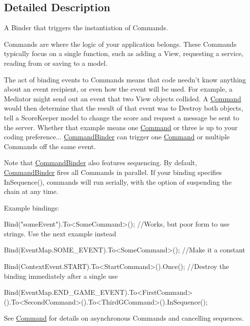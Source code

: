 \subsection{Detailed Description}
A Binder that triggers the instantiation of Commands. 

Commands are where the logic of your application belongs. These Commands typically focus on a single function, such as adding a View, requesting a service, reading from or saving to a model.

The act of binding events to Commands means that code needn't know anything about an event recipient, or even how the event will be used. For example, a Mediator might send out an event that two View objects collided. A \hyperlink{classstrange_1_1extensions_1_1command_1_1impl_1_1_command}{Command} would then determine that the result of that event was to Destroy both objects, tell a Score\-Keeper model to change the score and request a message be sent to the server. Whether that example means one \hyperlink{classstrange_1_1extensions_1_1command_1_1impl_1_1_command}{Command} or three is up to your coding preference... \hyperlink{classstrange_1_1extensions_1_1command_1_1impl_1_1_command_binder}{Command\-Binder} can trigger one \hyperlink{classstrange_1_1extensions_1_1command_1_1impl_1_1_command}{Command} or multiple Commands off the same event.

Note that \hyperlink{classstrange_1_1extensions_1_1command_1_1impl_1_1_command_binder}{Command\-Binder} also features sequencing. By default, \hyperlink{classstrange_1_1extensions_1_1command_1_1impl_1_1_command_binder}{Command\-Binder} fires all Commands in parallel. If your binding specifies {\ttfamily In\-Sequence()}, commands will run serially, with the option of suspending the chain at any time.

Example bindings\-: \begin{DoxyVerb}Bind("someEvent").To<SomeCommand>(); //Works, but poor form to use strings. Use the next example instead

Bind(EventMap.SOME_EVENT).To<SomeCommand>(); //Make it a constant

Bind(ContextEvent.START).To<StartCommand>().Once(); //Destroy the binding immediately after a single use

Bind(EventMap.END_GAME_EVENT).To<FirstCommand>().To<SecondCommand>().To<ThirdGCommand>().InSequence();
\end{DoxyVerb}


See \hyperlink{classstrange_1_1extensions_1_1command_1_1impl_1_1_command}{Command} for details on asynchronous Commands and cancelling sequences. 

